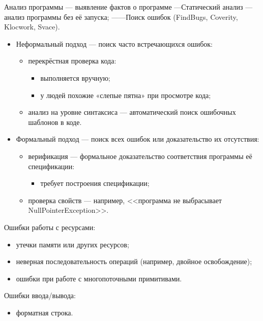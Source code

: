 
Анализ программы — выявление фактов о программе
---Статический анализ — анализ программы без её запуска;
------Поиск ошибок (FindBugs, Coverity, Klocwork, Svace).
\begin{itemize}
    \item Неформальный подход — поиск часто встречающихся ошибок:
    \begin{itemize}
        \item перекрёстная проверка кода:
        \begin{itemize}
            \item выполняется вручную;
            \item у людей похожие «слепые пятна» при просмотре кода;
        \end{itemize}
        \item анализ на уровне синтаксиса — автоматический поиск ошибочных шаблонов в коде.
    \end{itemize}
    \item Формальный подход — поиск всех ошибок или доказательство их отсутствия:
    \begin{itemize}
        \item верификация — формальное доказательство соответствия программы её спецификации:
        \begin{itemize}
            \item требует построения спецификации;
        \end{itemize}
        \item проверка свойств — например, <<программа не выбрасывает NullPointerException>>.
    \end{itemize}
\end{itemize}

Ошибки работы с ресурсами:
\begin{itemize}
    \item утечки памяти или других ресурсов;
    \item  неверная последовательность операций (например, двойное освобождение);
    \item ошибки при работе с многопоточными примитивами.
\end{itemize}
Ошибки ввода/вывода:
\begin{itemize}
    \item форматная строка.
\end{itemize}


